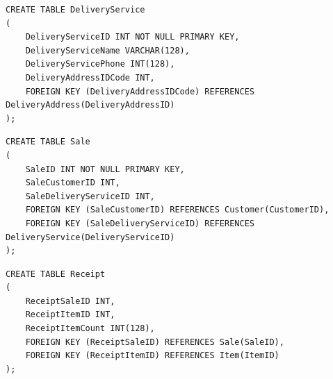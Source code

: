 \documentclass[11pt]{article}
\begin{document}
\begin{center}
\begin{verbatim}
\end{verbatim}
\begin{verbatim}
CREATE TABLE DeliveryService
(
    DeliveryServiceID INT NOT NULL PRIMARY KEY,
    DeliveryServiceName VARCHAR(128),
    DeliveryServicePhone INT(128),
    DeliveryAddressIDCode INT,
    FOREIGN KEY (DeliveryAddressIDCode) REFERENCES DeliveryAddress(DeliveryAddressID)
);

\end{verbatim}
\begin{verbatim}
CREATE TABLE Sale
(
    SaleID INT NOT NULL PRIMARY KEY,
    SaleCustomerID INT,
    SaleDeliveryServiceID INT,
    FOREIGN KEY (SaleCustomerID) REFERENCES Customer(CustomerID),
    FOREIGN KEY (SaleDeliveryServiceID) REFERENCES DeliveryService(DeliveryServiceID)
);

\end{verbatim}
\begin{verbatim}
CREATE TABLE Receipt
(
    ReceiptSaleID INT,
    ReceiptItemID INT,
    ReceiptItemCount INT(128),
    FOREIGN KEY (ReceiptSaleID) REFERENCES Sale(SaleID),
    FOREIGN KEY (ReceiptItemID) REFERENCES Item(ItemID)
);
\end{verbatim}
\end{center}
\end{document}

